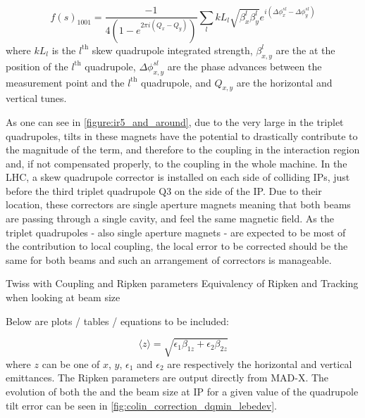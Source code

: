 \begin{equation}
    f(s)_{1001} = \frac{-1}{4 \left(1 - e^{2 \pi i \left(Q_x - Q_y \right)}\right)} \sum_l k L_l \sqrt{\beta_x^l \beta_y^l} e^{i \left(\Delta \phi_x^{s l} - \Delta \phi_y^{s l}\right)}
    \label{eq:skew_quad_contribution_to_f1001}
\end{equation}
where \(k L_l\) is the \(l^{\mathrm{th}}\) skew quadrupole integrated strength, \(\beta^l_{x,y}\) are the \betafunctions at the position of the \(l^{\mathrm{th}}\) quadrupole, \(\Delta \phi^{sl}_{x,y}\) are the phase advances between the measurement point and the \(l^{\mathrm{th}}\) quadrupole, and \(Q_{x,y}\) are the horizontal and vertical tunes.

As one can see in \cref{figure:ir5_and_around}, due to the very large \betafunctions in the triplet quadrupoles, tilts in these magnets have the potential to drastically contribute to the magnitude of the \foneohone term, and therefore to the coupling in the interaction region and, if not compensated properly, to the coupling in the whole machine.
In the LHC, a skew quadrupole corrector is installed on each side of colliding IPs, just before the third triplet quadrupole \(\mathrm{Q3}\) on the side of the IP.
Due to their location, these correctors are single aperture magnets meaning that both beams are passing through a single cavity, and feel the same magnetic field.
As the triplet quadrupoles - also single aperture magnets - are expected to be most of the contribution to local coupling, the local error to be corrected should be the same for both beams and such an arrangement of correctors is manageable.


Twiss with Coupling and Ripken parameters
Equivalency of Ripken and Tracking when looking at beam size

Below are plots / tables / equations to be included:

\begin{equation}
    \langle z \rangle = \sqrt{\epsilon_{1} \beta_{1z} + \epsilon_{2} \beta_{2z}}
    \label{eq:lebedev_beam_size}
\end{equation}
where $z$ can be one of $x$, $y$, $\epsilon_{1}$ and $\epsilon_{2}$ are respectively the horizontal and vertical emittances.
The Ripken parameters are output directly from MAD-X.
The evolution of both the \AbsCminus and the beam size at IP for a given value of the quadrupole tilt error can be seen in \cref{fig:colin_correction_dqmin_lebedev}.

